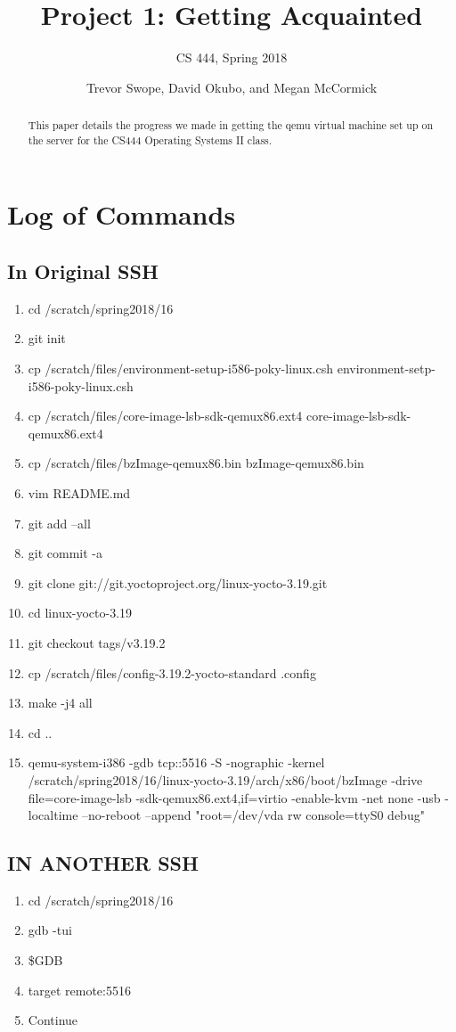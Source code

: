 \documentclass[letterpaper,10pt]{article}
\title{Project 1: Getting Acquainted}
\subtitle{CS 444, Spring 2018}
\author{Trevor Swope, David Okubo, and Megan McCormick}
\begin{document}
\begin{titlingpage}
\maketitle 
\begin{abstract}
This paper details the progress we made in getting the qemu virtual machine set up on the server for the CS444 Operating Systems II class.
\end{abstract}
\end{titlingpage}
\section{Log of Commands}
\subsection{In Original SSH}
\begin{enumerate}
	\item cd /scratch/spring2018/16
	\item git init
	\item  cp /scratch/files/environment-setup-i586-poky-linux.csh environment-setp-i586-poky-linux.csh
	\item cp /scratch/files/core-image-lsb-sdk-qemux86.ext4 core-image-lsb-sdk-qemux86.ext4
  \item cp /scratch/files/bzImage-qemux86.bin bzImage-qemux86.bin
  \item vim README.md
  \item git add --all
  \item git commit -a
  \item git clone git://git.yoctoproject.org/linux-yocto-3.19.git
  \item cd linux-yocto-3.19
  \item git checkout tags/v3.19.2
  \item cp /scratch/files/config-3.19.2-yocto-standard .config
  \item make -j4 all
  \item cd ..
  \item qemu-system-i386 -gdb tcp::5516 -S -nographic -kernel /scratch/spring2018/16/linux-yocto-3.19/arch/x86/boot/bzImage -drive file=core-image-lsb         -sdk-qemux86.ext4,if=virtio -enable-kvm -net none -usb -localtime --no-reboot --append "root=/dev/vda rw console=ttyS0 debug"
\end{enumerate}

\subsection{IN ANOTHER SSH}
\begin{enumerate}
  \item cd /scratch/spring2018/16
  \item gdb -tui
  \item \$GDB
  \item target remote:5516
  \item Continue
\end{enumerate}
\end{document}
